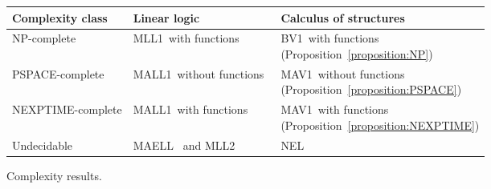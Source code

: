\documentclass[UKenglish,acmsmall,authorversion]{acmart}
\theoremstyle{plain}
\begin{document}

\begin{figure}[t]
\begin{tabular}{l|l|l}
Complexity class &
Linear logic &
Calculus of structures
\\ \hline
NP-complete &
\textsf{MLL1}~with functions~\cite{Kanovich1994} &
\txt{
\textsf{BV1}~with functions
\\
(Proposition~\ref{proposition:NP})
}
\\ \hline
PSPACE-complete &
\textsf{MALL1}~without functions~\cite{Lincoln1992} &
\txt{
\textsf{MAV1}~without functions
\\
(Proposition~\ref{proposition:PSPACE})
}
\\ \hline
NEXPTIME-complete &
\textsf{MALL1}~with functions~\cite{Lincoln1994,Lincoln1994b} &
\txt{
\textsf{MAV1}~with functions
\\
(Proposition~\ref{proposition:NEXPTIME})
}
\\ \hline
Undecidable &
\textsf{MAELL}~\cite{Lincoln1992}
and 
\textsf{MLL2}~\cite{Lincoln1995}
&
\textsf{NEL}~\cite{Strassburger2003}
\end{tabular}
\caption{Complexity results.}\label{figure:complexity}
\end{figure}
\end{document}
